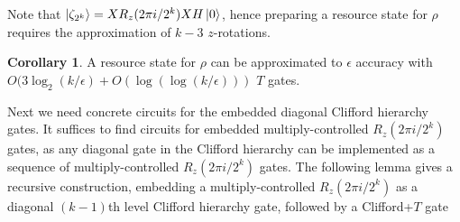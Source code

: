 \documentclass{article}
\theoremstyle{definition}
\theoremstyle{theorem}
\newtheorem{corollary}{Corollary}
\theoremstyle{remark}
\begin{document}
Note that $\ket{\zeta_{2^k}} = XR_z(2\pi i /2^k)XH\ket{0}$, hence preparing a resource state for $\rho$ requires the approximation of $k-3$ $z$-rotations.

\begin{corollary}
	A resource state for $\rho$ can be approximated to $\epsilon$ accuracy with $O(3 \log_2(k/\epsilon) + O(\log(\log(k/\epsilon)))$ $T$ gates.
\end{corollary}

Next we need concrete circuits for the embedded diagonal Clifford hierarchy gates. It suffices to find circuits for embedded multiply-controlled $R_z(2\pi i /2^k)$ gates, as any diagonal gate in the Clifford hierarchy can be implemented as a sequence of multiply-controlled $R_z(2\pi i /2^k)$ gates. The following lemma gives a recursive construction, embedding a multiply-controlled $R_z(2\pi i /2^k)$ as a diagonal $(k-1)$th level Clifford hierarchy gate, followed by a Clifford+$T$ gate
\end{document}
